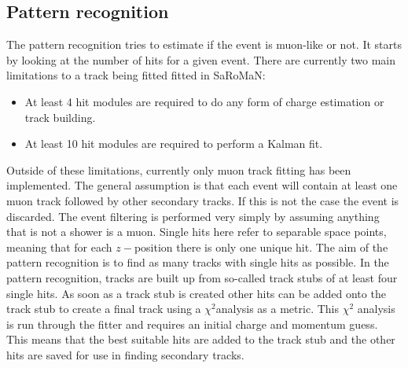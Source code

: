 
\subsection{Pattern recognition}
The pattern recognition tries to estimate if the event is muon-like or not. It starts by looking at the number of hits for a given event. There are currently two main limitations to a track being fitted fitted in SaRoMaN:
\begin{itemize}
\item At least 4 hit modules are required to do any form of charge estimation or track building.
\item At least 10 hit modules are required to perform a Kalman fit.
\end{itemize}
Outside of these limitations, currently only muon track fitting has been implemented. The general assumption is that each event will contain at least one muon track followed by other secondary tracks. If this is not the case the event is discarded. The event filtering is performed very simply by assuming anything that is not a shower is a muon. Single hits here refer to separable space points, meaning that for each $z-$position there is only one unique hit. The aim of the pattern recognition is to find as many tracks with single hits as possible. In the pattern recognition, tracks are built up from so-called track stubs of at least four single hits. As soon as a track stub is created other hits can be added onto the track stub to create a final track using a $\chi^2$analysis as a metric. This $\chi^2$ analysis is run through the fitter and requires an initial charge and momentum guess. This means that the best suitable hits are added to the track stub and the other hits are saved for use in finding secondary tracks. 

